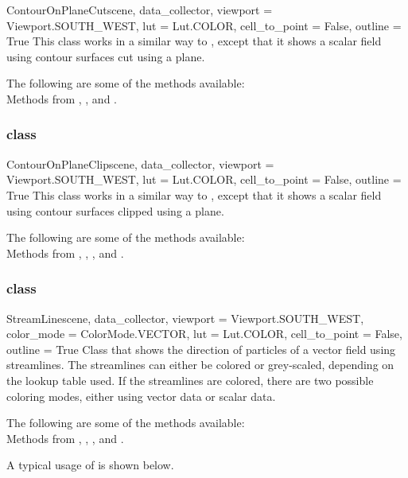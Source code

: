 \begin{classdesc}{ContourOnPlaneCut}{scene, data_collector,
viewport = Viewport.SOUTH_WEST, lut = Lut.COLOR, cell_to_point = False, 
outline = True}
This class works in a similar way to \MapOnPlaneCut, except that it shows a
scalar field using contour surfaces cut using a plane.
\end{classdesc}

The following are some of the methods available:\\
Methods from \ActorThreeD, \ContourModule, \Transform and \DataSetMapper. 

\subsubsection{\ContourOnPlaneClip class}

\begin{classdesc}{ContourOnPlaneClip}{scene, data_collector, 
viewport = Viewport.SOUTH_WEST, lut = Lut.COLOR, cell_to_point = False, 
outline = True}
This class works in a similar way to \MapOnPlaneClip, except that it shows a 
scalar field using contour surfaces clipped using a plane.
\end{classdesc}

The following are some of the methods available:\\
Methods from \ActorThreeD, \ContourModule, \Transform, \Clipper and 
\DataSetMapper. 

\subsubsection{\StreamLine class}

\begin{classdesc}{StreamLine}{scene, data_collector,
viewport = Viewport.SOUTH_WEST, color_mode = ColorMode.VECTOR, lut = Lut.COLOR,
cell_to_point = False, outline = True}
Class that shows the direction of particles of a vector field using streamlines.
The streamlines can either be colored or grey-scaled, depending on the lookup
table used. If the streamlines are colored, there are two possible coloring 
modes, either using vector data or scalar data.
\end{classdesc}

The following are some of the methods available:\\
Methods from \ActorThreeD, \PointSource, \StreamLineModule, \Tube and 
\DataSetMapper. 

A typical usage of \StreamLine is shown below.

